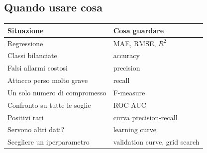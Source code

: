 \subsection{Quando usare cosa}
\begin{center}
    \begin{tabular}{l|l}
        \textbf{Situazione} & \textbf{Cosa guardare} \\ \hline
        Regressione                    & MAE, RMSE, $R^2$ \\
        Classi bilanciate              & accuracy \\
        Falsi allarmi costosi          & precision \\
        Attacco perso molto grave      & recall \\
        Un solo numero di compromesso  & F-measure \\
        Confronto su tutte le soglie   & ROC AUC \\
        Positivi rari                  & curva precision-recall \\
        Servono altri dati?            & learning curve \\
        Scegliere un iperparametro     & validation curve, grid search \\
    \end{tabular}
\end{center}

